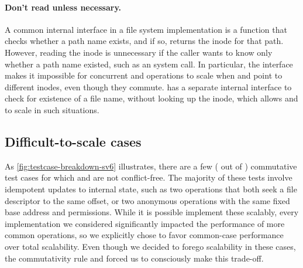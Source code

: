 \paragraph{Don't read unless necessary.}  A common internal interface
in a file system implementation is a  function that
checks whether a path name exists, and if so, returns the inode for
that path.
%
However, reading the inode is unnecessary
if the caller wants to know only whether a path name existed, such as
an  system call.  In particular, the 
interface makes it impossible for concurrent 
and  operations to scale when  and 
point to different inodes, even though they commute.
\fs has a separate internal interface to check for existence of a
file name, without looking up the inode, which allows 
and  to scale in such situations.


\subsection{Difficult-to-scale cases}

As \cref{fig:testcase-breakdown-sv6} illustrates, there are a few
( out of )
commutative test cases for
which \vm and \fs are not conflict-free.
%
The majority of these tests involve idempotent updates to internal
state, such as two  operations that both seek a file
descriptor to the same offset, or two anonymous  operations
with the same fixed base address and permissions.  While it is
possible implement these scalably, every implementation we considered
significantly impacted the performance of more common operations, so
we explicitly chose to favor common-case performance over total
scalability.  Even though we decided to forego scalability in these
cases, the commutativity rule and \tool forced us to consciously make
this trade-off.
%


